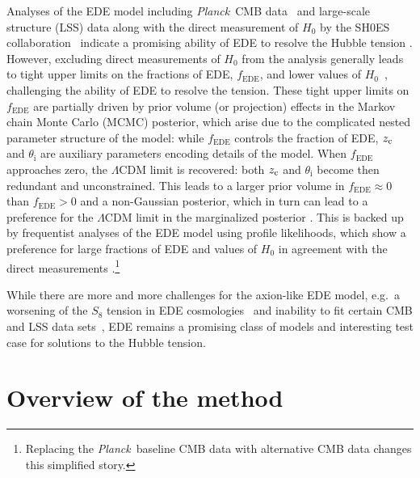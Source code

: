 \documentclass[aps, prd, reprint, superscriptaddress, nofootinbib, bibnotes]{revtex4-2}
\newcommand{\Planck}{\textit{Planck}}
\newcommand{\EDE}{\mathrm{EDE}}
\begin{document}
Analyses of the EDE model including \Planck\ CMB data~\cite{Planck:2018vyg} and large-scale structure (LSS) data along with the direct measurement of $H_0$ by the SH0ES collaboration~\cite{Riess:2021jrx} indicate a promising ability of EDE to resolve the Hubble tension \cite{Poulin:2018cxd, Smith:2019ihp, Schoneberg:2021qvd}. However, excluding direct measurements of $H_0$ from the analysis generally leads to tight upper limits on the fractions of EDE, $f_\EDE$, and lower values of $H_0$~\cite{Murgia:2020ryi, Hill:2020osr, Ivanov:2020ril, DAmico:2020ods, Smith:2020rxx, McDonough:2021pdg, Gsponer:2023wpm}, challenging the ability of EDE to resolve the tension. These tight upper limits on $f_\EDE$ are partially driven by prior volume (or projection) effects in the Markov chain Monte Carlo (MCMC) posterior, which arise due to the complicated nested parameter structure of the model: while $f_\mathrm{EDE}$ controls the fraction of EDE, $z_{\rm{c}}$ and $\theta_\mathrm{i}$ are auxiliary parameters encoding details of the model. When $f_\mathrm{EDE}$ approaches zero, the $\Lambda$CDM limit is recovered: both $z_{\rm{c}}$ and $\theta_\mathrm{i}$ become then redundant and unconstrained. This leads to a larger prior volume in $f_\mathrm{EDE} \approx 0$ than $f_\mathrm{EDE} > 0$ and a non-Gaussian posterior, which in turn can lead to a preference for the $\Lambda$CDM limit in the marginalized posterior \cite{Murgia:2020ryi, Smith:2020rxx, Niedermann:2020dwg}. This is backed up by frequentist analyses of the EDE model using profile likelihoods, which show a preference for large fractions of EDE and values of $H_0$ in agreement with the direct measurements \cite{Herold:2021ksg, Herold:2022iib, Reeves:2022aoi, Gomez-Valent:2022hkb}.\footnote{Replacing the \Planck\ baseline CMB data with alternative CMB data \cite{Hill:2021yec,Poulin:2021bjr,Efstathiou:2023fbn, McDonough:2023qcu} changes this simplified story.}

While there are more and more challenges for the axion-like EDE model, e.g.\ a worsening of the $S_8$ tension in EDE cosmologies~\cite{Smith:2019ihp, Hill:2020osr, Ivanov:2020ril, Vagnozzi:2021gjh, Ye:2021nej, Pedreira:2023qqt} and inability to fit certain CMB and LSS data sets~\cite{Efstathiou:2023fbn, McDonough:2023qcu, Goldstein:2023gnw}, EDE remains a promising class of models and interesting test case for solutions to the Hubble tension. 


\section{Overview of the method}
\label{sec:method}
\end{document}
